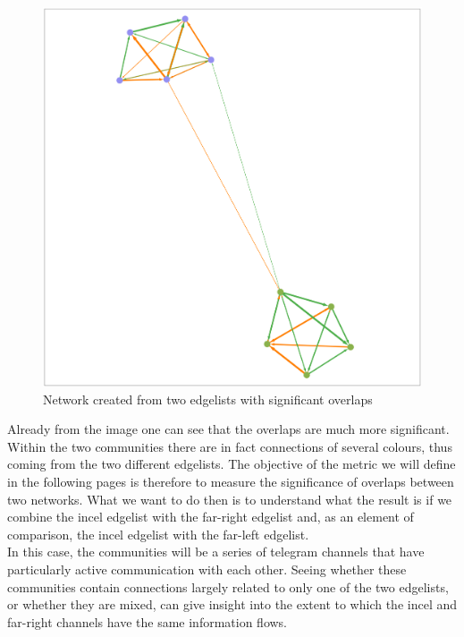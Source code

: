 \documentclass[a4paper,twoside,12pt, openany]{book}
\begin{document}
\begin{figure}[h!]
	\centering
	\includegraphics[scale=0.2]{mixed_graph.png}
	\caption{Network created from two edgelists with significant overlaps}
	\label{fig:overlaps}
\end{figure}

Already from the image one can see that the overlaps are much more significant. Within the two communities there are in fact connections of several colours, thus coming from the two different edgelists. The objective of the metric we will define in the following pages is therefore to measure the significance of overlaps between two networks. What we want to do then is to understand what the result is if we combine the incel edgelist with the far-right edgelist and, as an element of comparison, the incel edgelist with the far-left edgelist.\\
In this case, the communities will be a series of telegram channels that have particularly active communication with each other. Seeing whether these communities contain connections largely related to only one of the two edgelists, or whether they are mixed, can give insight into the extent to which the incel and far-right channels have the same information flows.\\
\end{document}

